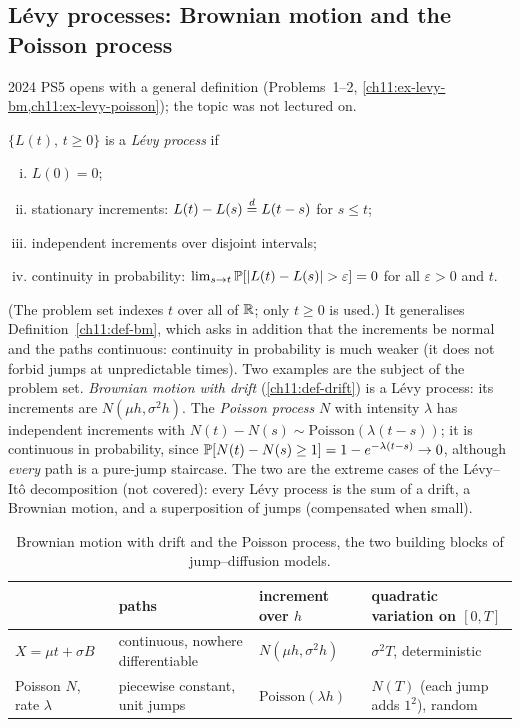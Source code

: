 \begin{paracol}{2}
\subsection{L\'evy processes: Brownian motion and the Poisson process}\label{ch11:sec-levy}
2024 PS5 opens with a general definition (Problems~1--2, \cref{ch11:ex-levy-bm,ch11:ex-levy-poisson}); the topic was not lectured on.

\begin{definition}\label{ch11:def-levy}
$\{L(t),\,t\ge0\}$ is a \emph{L\'evy process} if
\begin{enumerate}[(i)]
  \item $L(0)=0$;
  \item stationary increments: $L(t)-L(s)\stackrel{d}{=} L(t-s)$ for $s\le t$;
  \item independent increments over disjoint intervals;
  \item continuity in probability: $\lim_{s\to t}\Prob[|L(t)-L(s)|>\varepsilon]=0$ for all $\varepsilon>0$ and $t$.
\end{enumerate}
\end{definition}
(The problem set indexes $t$ over all of $\mathbb{R}$; only $t\ge0$ is used.) It generalises Definition~\ref{ch11:def-bm}, which asks in
addition that the increments be normal and the paths continuous: continuity in probability is much weaker (it does not forbid jumps
at unpredictable times). Two examples are the subject of the problem set. \emph{Brownian motion with drift} (\cref{ch11:def-drift})
is a L\'evy process: its increments are $N(\mu h,\sigma^2h)$. The \emph{Poisson process} $N$ with intensity $\lambda$ has
independent increments with $N(t)-N(s)\sim\mathrm{Poisson}(\lambda(t-s))$; it is continuous in probability, since
$\mathbb{P}[N(t)-N(s)\ge1]=1-e^{-\lambda(t-s)}\to0$, although \emph{every} path is a pure-jump staircase.
The two are the extreme cases of the L\'evy--It\^o decomposition (not covered): every L\'evy process is the sum of a drift, a Brownian motion,
and a superposition of jumps (compensated when small).

\begin{table}[ht]
\centering\small
\begin{tabularx}{\linewidth}{@{}l L L L@{}}
\toprule
& \textbf{paths} & \textbf{increment over $h$} & \textbf{quadratic variation on $[0,T]$}\\
\midrule
$X=\mu t+\sigma B$ & continuous, nowhere differentiable & $N(\mu h,\sigma^2h)$ & $\sigma^2T$, deterministic\\
Poisson $N$, rate $\lambda$ & piecewise constant, unit jumps & $\mathrm{Poisson}(\lambda h)$ & $N(T)$ (each jump adds $1^2$), random\\
\bottomrule
\end{tabularx}
\caption{Brownian motion with drift and the Poisson process, the two building blocks of jump--diffusion models.}\label{ch11:tab-levy}
\end{table}


\end{paracol}
